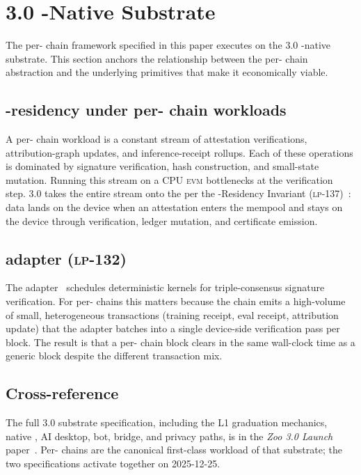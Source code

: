 \section{\Zoo{} 3.0 \GPU{}-Native Substrate}
\label{sec:zoo-3-0-substrate}

The per-\LLM{} chain framework specified in this paper executes on the
\Zoo{} 3.0 \GPU{}-native substrate. This section anchors the
relationship between the per-\LLM{} chain abstraction and the underlying
\GPU{} primitives that make it economically viable.

\subsection{\GPU{}-residency under per-\LLM{} chain workloads}

A per-\LLM{} chain workload is a constant stream of attestation
verifications, attribution-graph updates, and inference-receipt
rollups. Each of these operations is dominated by signature
verification, hash construction, and small-state mutation. Running
this stream on a CPU \textsc{evm} bottlenecks at the
verification step. \Zoo{} 3.0 takes the entire stream onto the
\GPU{} per the \GPU{}-Residency Invariant
(\textsc{lp-137})~\cite{lp-137-residency}: data lands on the device
when an attestation enters the mempool and stays on the device through
verification, ledger mutation, and certificate emission.

\subsection{\QuasarGPU{} adapter (\textsc{lp-132})}

The \QuasarGPU{} adapter~\cite{lp-132-quasargpu} schedules deterministic
\GPU{} kernels for triple-consensus signature verification. For per-\LLM{}
chains this matters because the chain emits a high-volume of small,
heterogeneous transactions (training receipt, eval receipt, attribution
update) that the adapter batches into a single device-side verification
pass per block. The result is that a per-\LLM{} chain block clears in
the same wall-clock time as a generic \Zoo{} block despite the different
transaction mix.

\subsection{Cross-reference}

The full \Zoo{} 3.0 substrate specification, including the L1 graduation
mechanics, native \DEX{}, AI desktop, bot, bridge, and privacy paths,
is in the \emph{Zoo 3.0 Launch} paper~\cite{zoo-3-0-launch}. Per-\LLM{}
chains are the canonical first-class workload of that substrate; the
two specifications activate together on 2025-12-25.
